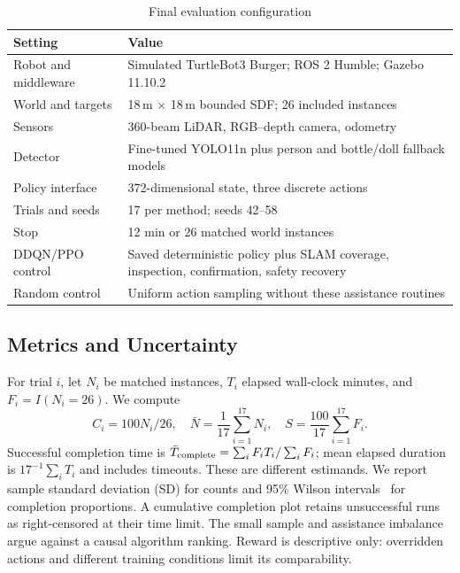 \documentclass[conference]{IEEEtran}
\begin{document}
\begin{table}[t]
\caption{Final evaluation configuration}
\label{tab:setup}
\centering\footnotesize
\begin{tabular}{@{}p{}p{}@{}}
\toprule
Setting & Value\\ \midrule
Robot and middleware & Simulated TurtleBot3 Burger; ROS 2 Humble; Gazebo 11.10.2\\
World and targets & 18\,m $\times$ 18\,m bounded SDF; 26 included instances\\
Sensors & 360-beam LiDAR, RGB--depth camera, odometry\\
Detector & Fine-tuned YOLO11n plus person and bottle/doll fallback models\\
Policy interface & 372-dimensional state, three discrete actions\\
Trials and seeds & 17 per method; seeds 42--58\\
Stop & 12 min or 26 matched world instances\\
DDQN/PPO control & Saved deterministic policy plus SLAM coverage, inspection, confirmation, safety recovery\\
Random control & Uniform action sampling without these assistance routines\\
\bottomrule
\end{tabular}
\end{table}

\subsection{Metrics and Uncertainty}
For trial $i$, let $N_i$ be matched instances, $T_i$ elapsed wall-clock minutes, and $F_i=I(N_i=26)$. We compute
\begin{equation}
C_i=100N_i/26,\quad
\bar N=\frac{1}{17}\sum_{i=1}^{17}N_i,\quad
S=\frac{100}{17}\sum_{i=1}^{17}F_i.
\label{eq:metrics}
\end{equation}
Successful completion time is
$\bar T_{\rm complete}=\sum_i F_iT_i/\sum_i F_i$; mean elapsed duration is $17^{-1}\sum_iT_i$ and includes timeouts. These are different estimands. We report sample standard deviation (SD) for counts and 95\% Wilson intervals~\cite{wilson1927} for completion proportions. A cumulative completion plot retains unsuccessful runs as right-censored at their time limit. The small sample and assistance imbalance argue against a causal algorithm ranking. Reward is descriptive only: overridden actions and different training conditions limit its comparability.
\end{document}
